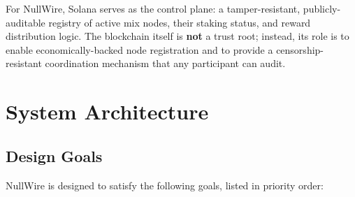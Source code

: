 \documentclass[11pt]{article}
\theoremstyle{definition}
\theoremstyle{remark}
\begin{document}
For NullWire, Solana serves as the control plane: a tamper-resistant, publicly-auditable registry of active mix nodes, their staking status, and reward distribution logic. The blockchain itself is \textbf{not} a trust root; instead, its role is to enable economically-backed node registration and to provide a censorship-resistant coordination mechanism that any participant can audit.

\section{System Architecture}
\label{sec:architecture}

\subsection{Design Goals}

NullWire is designed to satisfy the following goals, listed in priority order:
\end{document}
